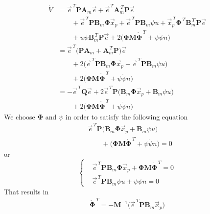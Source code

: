 \documentclass[12pt,a4paper,oneside]{book}
\begin{document}
\begin{onehalfspace}
\begin{equation}
\begin{aligned}
		\dot{V} &= \vec{e}^{\,T}\mathbf{P}\mathbf{A}_m\vec{e} +\vec{e}^{\,T}\mathbf{A}_m^{\,T}\mathbf{P}\vec{e} \\[6pt] & \qquad + \vec{e}^{\,T}\mathbf{P}\mathbf{B}_m\mathbf{\Phi}\vec{x}_p + \vec{e}^{\,T}\mathbf{P}\mathbf{B}_m\psi u + \vec{x}_p^{\,T}\mathbf{\Phi}^{\,T}\mathbf{B}_m^{\,T}\mathbf{P}\vec{e} \\[6pt] & \qquad + u\psi \mathbf{B}_m^{\,T}\mathbf{P}\vec{e}
		+2\Big(\mathbf{\Phi}\mathbf{M}\dot{\mathbf{\Phi}}^{\,T} + \psi\dot{\psi}n\Big)  \\[6pt]
		&= \vec{e}^{\,T}\Big(\mathbf{P}\mathbf{A}_m+\mathbf{A}_m^{\,T}\mathbf{P}\Big)\vec{e} \\[6pt] &\qquad+ 2\Big(\vec{e}^{\,T}\mathbf{P}\mathbf{B}_m\mathbf{\Phi}\vec{x}_p + \vec{e}^{\,T}\mathbf{P}\mathbf{B}_m\psi u\Big)\\[6pt]&\qquad+2\Big(\mathbf{\Phi}\mathbf{M}\dot{\mathbf{\Phi}}^{\,T} + \psi\dot{\psi}n\Big) \\[6pt]
		&= -\vec{e}^{\,T}\mathbf{Q}\vec{e} + 2\vec{e}^{\,T}\mathbf{P}\Big(\mathbf{B}_m\mathbf{\Phi}\vec{x}_p + \mathbf{B}_m\psi u\Big)\\[6pt]&\qquad+2\Big(\mathbf{\Phi}\mathbf{M}\dot{\mathbf{\Phi}}^{\,T} + \psi\dot{\psi}n\Big)
	\end{aligned}
\end{equation}
We choose $\mathbf{\Phi}$ and $\psi$ in order to satisfy the following equation
\begin{equation}
	\begin{aligned}
		&\vec{e}^{\,T}\mathbf{P}\Big(\mathbf{B}_m\mathbf{\Phi}\vec{x}_p + \mathbf{B}_m\psi u\Big)\\[6pt]&\qquad+\Big(\mathbf{\Phi}\mathbf{M}\dot{\mathbf{\Phi}}^{\,T} + \psi\dot{\psi}n\Big) = 0
	\end{aligned}
\end{equation}
or 
\begin{equation}
	\left\lbrace \begin{aligned}
		&\vec{e}^{\,T}\mathbf{P}\mathbf{B}_m\mathbf{\Phi}\vec{x}_p +\mathbf{\Phi}\mathbf{M}\dot{\mathbf{\Phi}}^{\,T} = 0 \\[8pt]
		&\vec{e}^{\,T}\mathbf{P}\mathbf{B}_m\psi u + \psi\dot{\psi}n = 0
	\end{aligned}\right. 
\end{equation}
That results in 
\begin{equation}
	\begin{aligned}
		\dot{\mathbf{\Phi}}^{\,T} = -\mathbf{M}^{-1}\Big(\vec{e}^{\,T}\mathbf{P}\mathbf{B}_m\vec{x}_p\Big)

\end{aligned}
\end{equation}
\end{onehalfspace}
\end{document}
